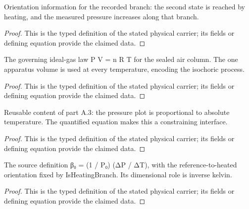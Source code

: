 \begin{definition}
  \label{def:physics:IPhO_2026_4_A_5:aux009}
  Orientation information for the recorded branch: the second state is reached by heating, and the measured pressure increases along that branch.
\end{definition}
\begin{proof}
  This is the typed definition of the stated physical carrier; its fields or defining equation provide the claimed data.
\end{proof}

\begin{definition}
  \label{def:physics:IPhO_2026_4_A_5:aux010}
  The governing ideal-gas law P V = n R T for the sealed air column. The one apparatus volume is used at every temperature, encoding the isochoric process.
\end{definition}
\begin{proof}
  This is the typed definition of the stated physical carrier; its fields or defining equation provide the claimed data.
\end{proof}

\begin{definition}
  \label{def:physics:IPhO_2026_4_A_5:aux011}
  Reusable content of part A.3: the pressure plot is proportional to absolute temperature. The quantified equation makes this a constraining interface.
\end{definition}
\begin{proof}
  This is the typed definition of the stated physical carrier; its fields or defining equation provide the claimed data.
\end{proof}

\begin{definition}
  \label{def:physics:IPhO_2026_4_A_5:aux012}
  The source definition β₀ = (1 / P₀) (ΔP / ΔT), with the reference-to-heated orientation fixed by IsHeatingBranch. Its dimensional role is inverse kelvin.
\end{definition}
\begin{proof}
  This is the typed definition of the stated physical carrier; its fields or defining equation provide the claimed data.
\end{proof}

